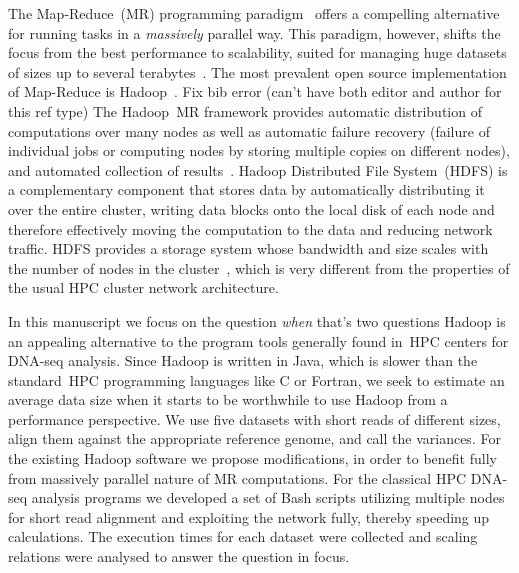 \documentclass[11pt, oneside]{article}   	%
\newcommand{\COMMENT}[1]{{\color{red} #1 }}
\begin{document}
The Map-Reduce~(MR) programming paradigm~\cite{hadoop} offers a compelling alternative for running tasks in a {\it massively} parallel way. This paradigm, however, shifts the focus from the best performance to scalability, suited for managing huge datasets of sizes up to several terabytes~\cite{lin2010}.
The most prevalent open source implementation of Map-Reduce is Hadoop~\cite{hadoop,Hadoop:Guide}. \COMMENT{Fix bib error (can't have both editor and author for this ref type)} 
The Hadoop~MR framework provides automatic distribution of computations over many nodes as well as automatic failure recovery (failure of individual jobs or computing nodes by storing multiple copies on different nodes), and automated collection of results~\cite{Hadoop:Guide}. Hadoop Distributed File System~(HDFS) is a complementary component that stores data by automatically distributing it over the entire cluster, writing data blocks onto the local disk of each node and therefore effectively moving the computation to the data and reducing network traffic. HDFS provides a storage system whose bandwidth and size scales with the number of nodes in the cluster~\cite{Sammer:2012}, which is very different from the properties of the usual HPC cluster network architecture. 

In this manuscript we focus on the question {\it when} \COMMENT{that's two questions} Hadoop is an appealing alternative to the program tools generally found in~HPC centers for DNA-seq analysis. Since Hadoop is written in Java, which is slower than the standard~HPC programming languages like C or Fortran, we seek to estimate an average data size when it starts to be worthwhile to use Hadoop from a performance perspective. We use five datasets with short reads of different sizes, align them against the appropriate reference genome, and call the variances.
For the existing Hadoop software we propose modifications, in order to benefit fully from massively parallel nature of MR computations. 
For the classical HPC DNA-seq analysis programs we developed a set of Bash scripts utilizing multiple nodes for short read alignment and exploiting the network fully, thereby speeding up calculations.
The execution times for each dataset were collected and scaling relations were analysed to answer the question in focus.

\end{document}
